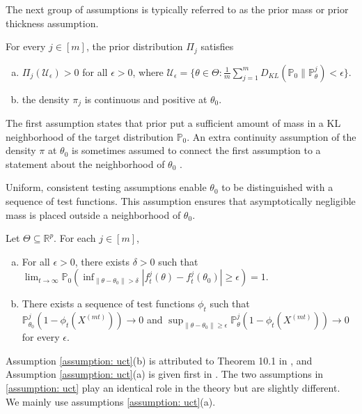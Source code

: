 \documentclass[twoside,11pt]{article}
\numberwithin{equation}{section}
\newcommand{\R}{{\mathbb{R}}}
\newcommand{\U}{\mathcal{U}}
\newcommand\bP{\mathbb{P}}
\begin{document}
{{The next group of assumptions is typically referred to as the prior mass or prior thickness assumption. }
\begin{assumption}\label{assumption: pmc}
For every $j \in [m]$, the prior distribution $\Pi_j$ satisfies
\begin{enumerate}[(a)]
    \item $\Pi_j(\U_\epsilon) > 0$ for all $\epsilon > 0$, where $\U_\epsilon = \{\theta \in \Theta: \frac{1}{m}\sum_{j = 1}^m D_{KL}(\bP_0 \parallel \bP_\theta^j)<  \epsilon\}$. 
    \item the density $\pi_j$ is continuous and positive at $\theta_0$. 
\end{enumerate}
\end{assumption}

The first assumption states that prior put a sufficient amount of mass in a KL neighborhood of the target distribution $\bP_0$. An extra continuity assumption of the density $\pi$ at $\theta_0$ is sometimes assumed to connect the first assumption to a statement about the neighborhood of $\theta_0$ \citep{VanderVaart2000}. 

Uniform, consistent testing assumptions enable $\theta_0$ to be distinguished with a sequence of test functions.  This assumption ensures that asymptotically negligible mass is placed outside a neighborhood of $\theta_0$. 
\begin{assumption}\label{assumption: uct}
Let $\Theta \subseteq \R^p$.  For each $j \in [m]$,  
\begin{enumerate}[(a)]
    \item For all $\epsilon > 0$, there exists $\delta > 0$ such that $\lim_{t \to \infty} \bP_0(\inf_{\|\theta - \theta_0\| > \delta}|f_t^j(\theta) - f_t^j(\theta_0)| \geq \epsilon) = 1$. 
    \item There exists a sequence of test functions $\phi_t$ such that $\bP_{\theta_0}^j (1 - \phi_t(X^{(mt)})) \to 0$ and $\sup_{\|\theta - \theta_0\| \geq \epsilon} \bP_\theta^j (1 - \phi_t(X^{(mt)})) \to 0$ for every $\epsilon$.
\end{enumerate} 
\end{assumption}
Assumption \ref{assumption: uct}(b) is attributed to Theorem 10.1 in \cite{VanderVaart2000}, and Assumption \ref{assumption: uct}(a) is given first in \cite{ghoshramamoorthi}. The two assumptions in \ref{assumption: uct} play an identical role in the theory but are slightly different. We mainly use assumptions \ref{assumption: uct}(a). 

}
\end{document}
